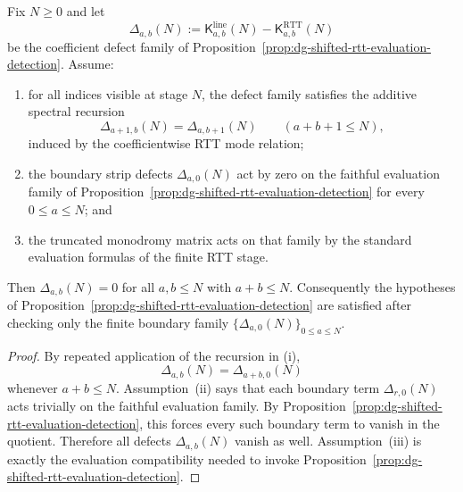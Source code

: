 \begin{proposition}
\label{prop:dg-shifted-rtt-boundary-seed}
Fix $N \ge 0$ and let
\[
\Delta_{a,b}(N):=
\mathsf{K}^{\mathrm{line}}_{a,b}(N)
-\mathsf{K}^{\mathrm{RTT}}_{a,b}(N)
\]
be the coefficient defect family of
Proposition~\ref{prop:dg-shifted-rtt-evaluation-detection}.  Assume:
\begin{enumerate}[label=\textup{(\roman*)}]
\item for all indices visible at stage $N$, the defect family satisfies
  the additive spectral recursion
  \[
  \Delta_{a+1,b}(N)=\Delta_{a,b+1}(N)
  \qquad (a+b+1 \le N),
  \]
  induced by the coefficientwise RTT mode relation;
\item the boundary strip defects
  $\Delta_{a,0}(N)$ act by zero on the faithful evaluation family of
  Proposition~\ref{prop:dg-shifted-rtt-evaluation-detection} for every
  $0 \le a \le N$; and
\item the truncated monodromy matrix acts on that family by the
  standard evaluation formulas of the finite RTT stage.
\end{enumerate}
Then $\Delta_{a,b}(N)=0$ for all $a,b \le N$ with $a+b \le N$.
Consequently the hypotheses of
Proposition~\ref{prop:dg-shifted-rtt-evaluation-detection} are
satisfied after checking only the finite boundary family
$\{\Delta_{a,0}(N)\}_{0 \le a \le N}$.
\end{proposition}

\begin{proof}
By repeated application of the recursion in \textup{(i)},
\[
\Delta_{a,b}(N)=\Delta_{a+b,0}(N)
\]
whenever $a+b \le N$.  Assumption~\textup{(ii)} says that each boundary
term $\Delta_{r,0}(N)$ acts trivially on the faithful evaluation family.
By Proposition~\ref{prop:dg-shifted-rtt-evaluation-detection}, this
forces every such boundary term to vanish in the quotient.  Therefore
all defects $\Delta_{a,b}(N)$ vanish as well.  Assumption~\textup{(iii)}
is exactly the evaluation compatibility needed to invoke
Proposition~\ref{prop:dg-shifted-rtt-evaluation-detection}.
\end{proof}

